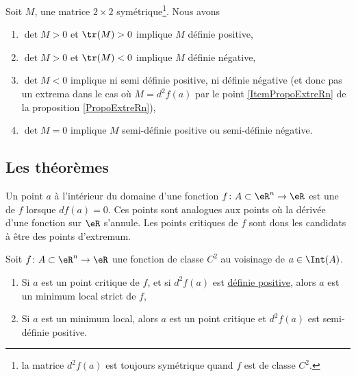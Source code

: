 \begin{proposition}
	Soit $M$, une matrice $2\times 2$ symétrique\footnote{la matrice $d^2f(a)$ est toujours symétrique quand $f$ est de classe $C^2$.}. Nous avons
	\begin{enumerate}
		\item
		$\det M>0$ et $\tr(M)>0$ implique $M$ définie positive,
		\item
		$\det M>0$ et $\tr(M)<0$ implique $M$ définie négative,
		\item
		$\det M<0$ implique ni semi définie positive, ni définie négative (et donc pas un extrema dans le cas où $M=d^2f(a)$ par le point \ref{ItemPropoExtreRn} de la proposition \ref{PropoExtreRn}),
		\item
		$\det M=0$ implique $M$ semi-définie positive ou semi-définie négative.
	\end{enumerate}
\end{proposition}
 

					\subsection{Les théorèmes}



Un point $a$ à l'intérieur du domaine d'une fonction $f\colon A\subset\eR^n\to \eR$ est une  de $f$ lorsque $df(a)=0$. Ces points sont analogues aux points où la dérivée d'une fonction sur $\eR$ s'annule. Les points critiques de $f$ sont dons les candidats à être des points d'extremum.

\begin{proposition}		\label{PropoExtreRn}
Soit $f\colon A\subset\eR^n\to \eR$ une fonction de classe $C^2$ au voisinage de $a\in\Int(A)$.
\begin{enumerate}

\item
Si $a$ est un point critique de $f$, et si $d^2f(a)$ est \href{http://fr.wikipedia.org/wiki/Matrice_définie_positive}{définie positive}, alors $a$ est un minimum local strict de $f$,
\item		\label{ItemPropoExtreRn}
Si $a$ est un minimum local, alors $a$ est un point critique et $d^2f(a)$ est semi-définie positive.

\end{enumerate}
\end{proposition}

